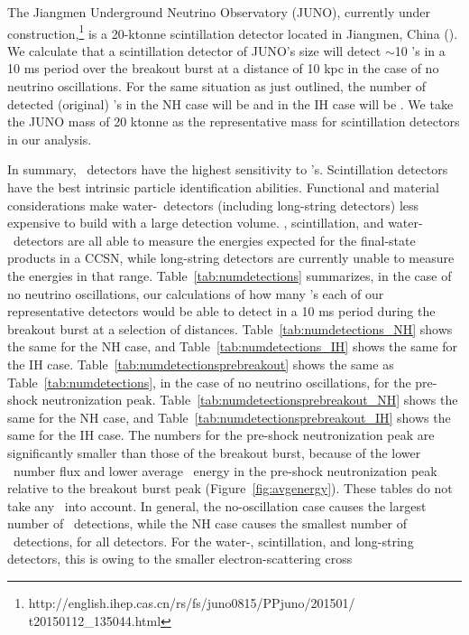 The Jiangmen Underground Neutrino Observatory (JUNO), currently under
construction,\footnote{http://english.ihep.cas.cn/rs/fs/juno0815/PPjuno/201501/
t20150112\_135044.html} is a 20-ktonne
scintillation detector located in Jiangmen, China (\citealt{li2014}).  We calculate 
that a scintillation detector of JUNO's size will detect 
$\sim$10 \nue's in a 10 ms period over the
breakout burst at a distance of 10 kpc in the case of no neutrino
oscillations.  For the same situation as just outlined, the number of
detected (original) \nue's in the NH case will be  and in the IH
case will be .  We take the JUNO mass of 20
ktonne as the representative mass for scintillation detectors in our
analysis. 

In summary, \ detectors have the highest sensitivity to \nue's. 
Scintillation detectors  have the best intrinsic 
particle identification abilities.
Functional and material
considerations make water-\cer\ detectors (including long-string
detectors) less expensive to build with a large detection volume.
, scintillation, and water-\cer\ detectors are 
all able to measure the energies expected for the
final-state products in a CCSN, while long-string detectors 
are currently unable to measure the energies in that range.  
Table~\ref{tab:numdetections} summarizes, in the case of no neutrino
oscillations, 
our calculations of how many \nue's each of our representative
detectors would be able to detect in a 10 ms period during the
breakout burst at a selection of
distances. Table~\ref{tab:numdetections_NH} shows the same for the NH
case, and  Table~\ref{tab:numdetections_IH} shows the same for the IH case.
Table~\ref{tab:numdetectionsprebreakout}  shows
the same as Table~\ref{tab:numdetections}, in the case
of no neutrino oscillations, for the
pre-shock neutronization peak.  
Table~\ref{tab:numdetectionsprebreakout_NH} shows the same for the NH
case, and  Table~\ref{tab:numdetectionsprebreakout_IH} shows the 
same for the IH case.
The numbers for the pre-shock
neutronization peak are significantly smaller than those of the
breakout burst, because of the lower \nue\ number flux and lower average
\nue\ energy in the pre-shock neutronization peak relative to the
breakout burst peak (Figure~\ref{fig:avgenergy}).  These tables do not
take any \backgrounds\ into account.  In general, the no-oscillation
case causes the largest number of \nue\ detections, while the NH
case causes the smallest number of \nue\ detections, for all
detectors. For the water-\cer, scintillation, and long-string
detectors, this is owing to the smaller electron-scattering cross
